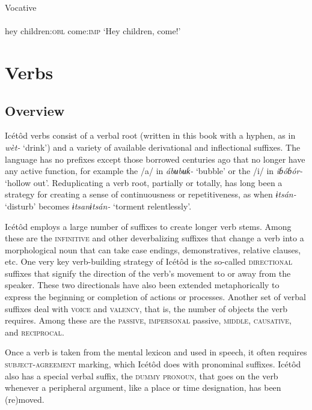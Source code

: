 Vocative
\ea\label{ex:}
 \\
    \\
hey   children:\textsc{obl}  come:\textsc{imp}
\glt ‘Hey children, come!’ 
\z




\section{Verbs}



\subsection{Overview}


Icétôd verbs consist of a verbal root (written in this book with a hyphen, as in \textit{wèt-} ‘drink’) and a variety of available derivational and inflectional suffixes. The language has no prefixes except those borrowed centuries ago that no longer have any active function, for example the /a/ in \textit{ábʉbʉƙ-} ‘bubble’ or the /i/ in \textit{iɓóɓór-} ‘hollow out’. Reduplicating a verb root, partially or totally, has long been a strategy for creating a sense of continuousness or repetitiveness, as when \textit{ɨtsán-} ‘disturb’ becomes \textit{ɨtsanɨtsán-} ‘torment relentlessly’. 

Icétôd employs a large number of suffixes to create longer verb stems. Among these are the \textsc{infinitive} and other deverbalizing suffixes that change a verb into a morphological noun that can take case endings, demonstratives, relative clauses, etc. One very key verb-building strategy of Icétôd is the so-called \textsc{directional} suffixes that signify the direction of the verb’s movement to or away from the speaker. These two directionals have also been extended metaphorically to express the beginning or completion of actions or processes. Another set of verbal suffixes deal with \textsc{voice} and \textsc{valency}, that is, the number of objects the verb requires. Among these are the \textsc{passive}, \textsc{impersonal} passive, \textsc{middle}, \textsc{causative}, and \textsc{reciprocal}.

Once a verb is taken from the mental lexicon and used in speech, it often requires \textsc{subject-agreement} marking, which Icétôd does with pronominal suffixes. Icétôd also has a special verbal suffix, the \textsc{dummy} \textsc{pronoun}, that goes on the verb whenever a peripheral argument, like a place or time designation, has been (re)moved.

